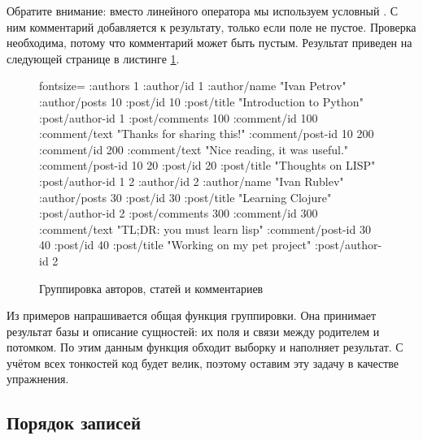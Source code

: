 
Обратите внимание: вместо линейного оператора \code{\arr} мы используем условный . С ним комментарий добавляется к результату, только если поле  не пустое. Проверка необходима, потому что комментарий может быть пустым. Результат приведен на следующей странице в листинге \ref{lis:nested-result}.

\begin{figure}[ht!]

\begin{english}
  \begin{clojure*}{fontsize=\small}
{:authors
 {1 {:author/id 1
     :author/name "Ivan Petrov"
     :author/posts
       {10 {:post/id 10
            :post/title "Introduction to Python"
            :post/author-id 1
            :post/comments
              {100 {:comment/id 100
                    :comment/text "Thanks for sharing this!"
                    :comment/post-id 10}
               200 {:comment/id 200
                    :comment/text "Nice reading, it was useful."
                    :comment/post-id 10}}}
        20 {:post/id 20
            :post/title "Thoughts on LISP"
            :post/author-id 1}}}
  2 {:author/id 2
     :author/name "Ivan Rublev"
     :author/posts
       {30 {:post/id 30
            :post/title "Learning Clojure"
            :post/author-id 2
            :post/comments
              {300 {:comment/id 300
                    :comment/text "TL;DR: you must learn lisp"
                    :comment/post-id 30}}}
        40 {:post/id 40
            :post/title "Working on my pet project"
            :post/author-id 2}}}}}
  \end{clojure*}
\end{english}

\captionsetup{labelformat=lis}
\caption{Группировка авторов, статей и комментариев}

\label{lis:nested-result}

\end{figure}

Из примеров напрашивается общая функция группировки. Она принимает результат базы и описание сущностей: их поля и связи между родителем и потомком. По этим данным функция обходит выборку и наполняет результат. С учётом всех тонкостей код будет велик, поэтому оставим эту задачу в качестве упражнения.

\subsection{Порядок записей}

